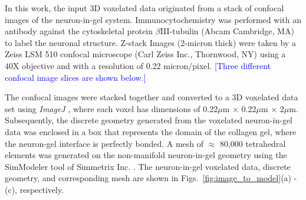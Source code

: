 \documentclass[]{interact}
\newcommand{\blue}[1]{\textcolor{blue}{[#1]}}
\begin{document}
In this work, the input 3D voxelated data originated from a stack of confocal images of the neuron-in-gel system. Immunocytochemistry was performed with an antibody against the cytoskeletal protein $\beta$III-tubulin (Abcam Cambridge, MA) to label the neuronal structure. Z-stack Images (2-micron thick) were taken by a Zeiss LSM 510 confocal microscope (Carl Zeiss Inc., Thornwood, NY) using a 40X objective and with a resolution of 0.22 micron/pixel. \blue{Three different confocal image slices are shown below.} 

The confocal images were stacked together and converted to a 3D voxelated data set using \textit{ImageJ} \citep{Schneider:2012dw}, where each voxel has dimensions of 0.22$\mu$m $\times$ 0.22$\mu$m $\times$ 2$\mu$m. Subsequently, the discrete geometry generated from the voxelated neuron-in-gel data was enclosed in a box that represents the domain of the collagen gel, where the neuron-gel interface is perfectly bonded. A mesh of $\approx$ 80,000 tetrahedral elements was generated on the non-manifold neuron-in-gel geometry using the SimModeler tool of Simmetrix Inc. \citep{simmetrix,Shephard:2000vc}. The neuron-in-gel voxelated data, discrete geometry, and corresponding mesh are shown in Figs.\ \ref{fig:image_to_model}(a) - (c), respectively. 
%
\end{document}

